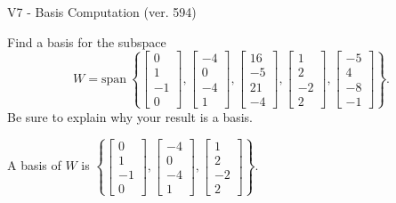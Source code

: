 \begin{exercise}
  \begin{exerciseTitle}V7 - Basis Computation (ver. 594)\end{exerciseTitle}
  \begin{exerciseStatement}
    Find a basis for the subspace 
\[W=\mathrm{span}\ \left\{\left[\begin{array}{r}
0 \\
1 \\
-1 \\
0
\end{array}\right] , \left[\begin{array}{r}
-4 \\
0 \\
-4 \\
1
\end{array}\right] , \left[\begin{array}{r}
16 \\
-5 \\
21 \\
-4
\end{array}\right] , \left[\begin{array}{r}
1 \\
2 \\
-2 \\
2
\end{array}\right] , \left[\begin{array}{r}
-5 \\
4 \\
-8 \\
-1
\end{array}\right]\right\}.\]
 Be sure to explain why your result is a basis.


  \end{exerciseStatement}
  \begin{exerciseAnswer}
   A basis of \(W\) is  \(\left\{\left[\begin{array}{r}
0 \\
1 \\
-1 \\
0
\end{array}\right] , \left[\begin{array}{r}
-4 \\
0 \\
-4 \\
1
\end{array}\right] , \left[\begin{array}{r}
1 \\
2 \\
-2 \\
2
\end{array}\right]\right\}\).
  


  \end{exerciseAnswer}
\end{exercise}